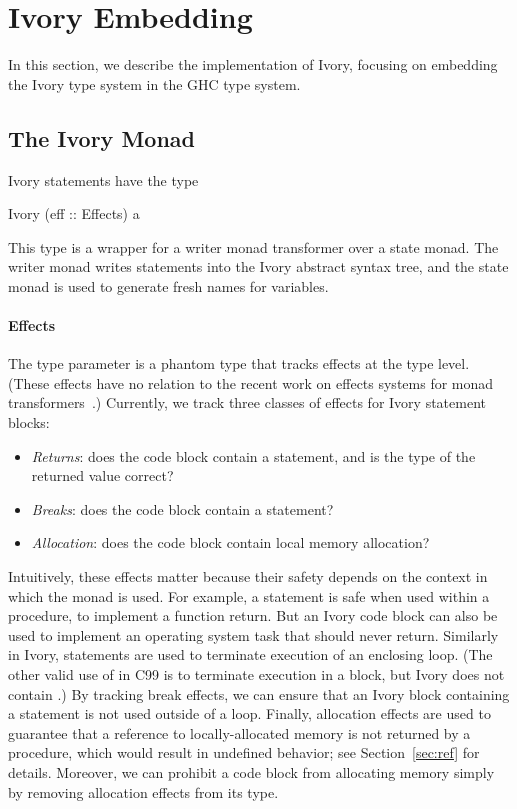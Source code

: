 \section{Ivory Embedding}
\label{sec:ivory-embedding}

In this section, we describe the implementation of Ivory, focusing on embedding
the Ivory type system in the GHC type system.

\subsection{The Ivory Monad}
\label{sec:ivory-monad}

Ivory statements have the type

\begin{code}
Ivory (eff :: Effects) a
\end{code}

\noindent
This type is a wrapper for a writer monad transformer over a state monad. The writer
monad writes statements into the Ivory abstract syntax tree, and the
state monad is used to generate fresh names for variables.

\paragraph{Effects}
The  type parameter is a phantom type that tracks
effects at the type level. (These effects have no relation to
the recent work on effects systems for monad transformers~\cite{effects}.)
Currently, we track three classes of effects for Ivory statement blocks:

\begin{itemize}
\item \emph{Returns}: does the code block contain a  statement, and
  is the type of the returned value correct?
\item \emph{Breaks}: does the code block contain a  statement?
\item \emph{Allocation}: does the code block contain local memory allocation?
\end{itemize}

Intuitively, these effects matter because their safety depends on the context in
which the monad is used. For example, a  statement is safe when used
within a procedure, to implement a function return. But an Ivory code block can
also be used to implement an operating system task that should never
return. Similarly in Ivory,  statements are used to terminate
execution of an enclosing loop. (The other valid use of  in C99 is to
terminate execution in a  block, but Ivory does not contain
.) By tracking break effects, we can ensure that an Ivory block
containing a  statement is not used outside of a loop. Finally,
allocation effects are used to guarantee that a reference to locally-allocated
memory is not returned by a procedure, which would result in undefined behavior; see
Section~\ref{sec:ref} for details. Moreover, we can prohibit a code block from
allocating memory simply by removing allocation effects from its type.

